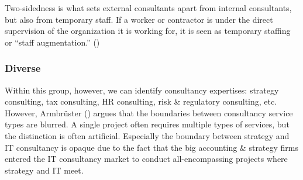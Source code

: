 \documentclass[
  man,floatsintext]{apa6}
\begin{document}
Two-sidedness is what sets external consultants apart from internal consultants, but also from temporary staff. If a worker or contractor is under the direct supervision of the organization it is working for, it is seen as temporary staffing or ``staff augmentation.'' ()

\subsubsection{Diverse}\label{diverse}

Within this group, however, we can identify consultancy expertises: strategy consulting, tax consulting, HR consulting, risk \& regulatory consulting, etc. However, Armbrüster () argues that the boundaries between consultancy service types are blurred. A single project often requires multiple types of services, but the distinction is often artificial. Especially the boundary between strategy and IT consultancy is opaque due to the fact that the big accounting \& strategy firms entered the IT consultancy market to conduct all-encompassing projects where strategy and IT meet.
\end{document}
